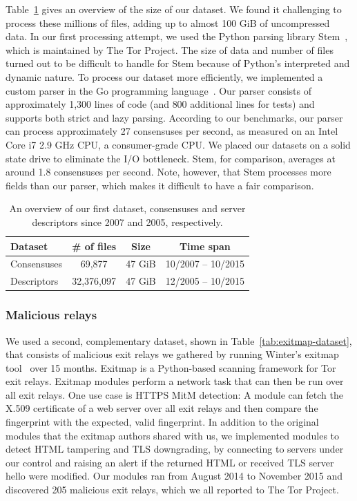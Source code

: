 Table~\ref{tab:collector-dataset} gives an overview of the size of our dataset.
We found it challenging to process these millions of files, adding up to almost
100 GiB of uncompressed data.  In our first processing attempt, we used the
Python parsing library Stem~\cite{stem}, which is maintained by The Tor Project.
The size of data and number of files turned out to be difficult to handle for
Stem because of Python's interpreted and dynamic nature.  To process our dataset
more efficiently, we implemented a custom parser in the Go programming
language~\cite{zoossh}.  Our parser consists of approximately 1,300 lines of
code (and 800 additional lines for tests) and supports both strict and lazy
parsing.  According to our benchmarks, our parser can process approximately 27
consensuses per second, as measured on an Intel Core i7 2.9 GHz CPU, a
consumer-grade CPU.  We placed our datasets on a solid state drive to eliminate
the I/O bottleneck.  Stem, for comparison, averages at around 1.8 consensuses
per second.  Note, however, that Stem processes more fields than our parser,
which makes it difficult to have a fair comparison.

\begin{table}[t]
\centering
\begin{tabular}{l c c c}
\textbf{Dataset} & \textbf{\# of files} & \textbf{Size} & \textbf{Time span} \\
\hline
Consensuses & 69,877 & 47 GiB & 10/2007 -- 10/2015 \\
Descriptors & 32,376,097 & 47 GiB & 12/2005 -- 10/2015 \\
\end{tabular}
\caption{An overview of our first dataset, consensuses and server descriptors
since 2007 and 2005, respectively.}
\label{tab:collector-dataset}
\end{table}

\subsubsection{Malicious relays}
We used a second, complementary dataset, shown in
Table~\ref{tab:exitmap-dataset}, that consists of malicious exit relays we
gathered by running Winter's exitmap tool~\cite[\S 3.1]{Winter2014a} over 15
months.  Exitmap is a Python-based scanning framework for Tor exit relays.
Exitmap modules perform a network task that can then be run over all exit
relays.  One use case is HTTPS MitM detection: A module can fetch the X.509
certificate of a web server over all exit relays and then compare the
fingerprint with the expected, valid fingerprint.  In addition to the original
modules that the exitmap authors shared with us, we implemented modules to
detect HTML tampering and TLS downgrading, by connecting to servers under our
control and raising an alert if the returned HTML or received TLS server hello
were modified.  Our modules ran from August 2014 to November 2015 and discovered
205 malicious exit relays, which we all reported to The Tor Project.

